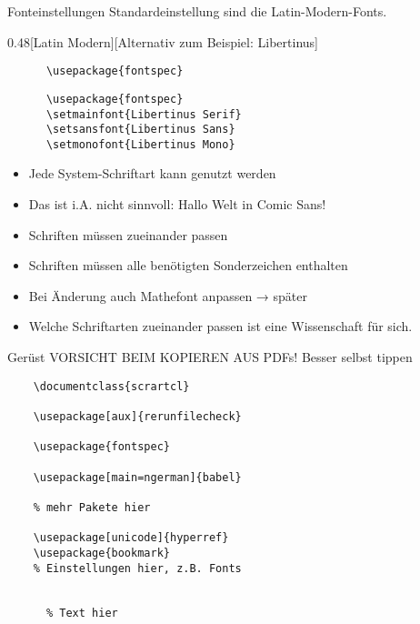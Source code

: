 \begin{frame}[fragile]{
  Fonteinstellungen
  \hfill
}
  Standardeinstellung sind die Latin-Modern-Fonts.
  \vspace{1em}
  \begin{CodeExplanation}{0.48}[Latin Modern][Alternativ zum Beispiel: Libertinus]
    \begin{lstlisting}
      \usepackage{fontspec}
    \end{lstlisting}
  \Explanation
    \begin{lstlisting}
      \usepackage{fontspec}
      \setmainfont{Libertinus Serif}
      \setsansfont{Libertinus Sans}
      \setmonofont{Libertinus Mono}
    \end{lstlisting}
  \end{CodeExplanation}
  \begin{itemize}
    \item Jede System-Schriftart kann genutzt werden
    \item \alert{Das ist i.A. nicht sinnvoll:  Hallo Welt in Comic Sans!}
    \item Schriften müssen zueinander passen
    \item Schriften müssen alle benötigten Sonderzeichen enthalten
    \item Bei Änderung auch Mathefont anpassen → später
    \item Welche Schriftarten zueinander passen ist eine Wissenschaft für sich.
  \end{itemize}
\end{frame}

\begin{frame}[fragile]{Gerüst}
  \alert{VORSICHT BEIM KOPIEREN AUS PDFs! Besser selbst tippen}

  \begin{lstlisting}
    \documentclass{scrartcl}

    \usepackage[aux]{rerunfilecheck}

    \usepackage{fontspec}

    \usepackage[main=ngerman]{babel}

    % mehr Pakete hier

    \usepackage[unicode]{hyperref}
    \usepackage{bookmark}
    % Einstellungen hier, z.B. Fonts

    
      % Text hier
    
  \end{lstlisting}
\end{frame}

